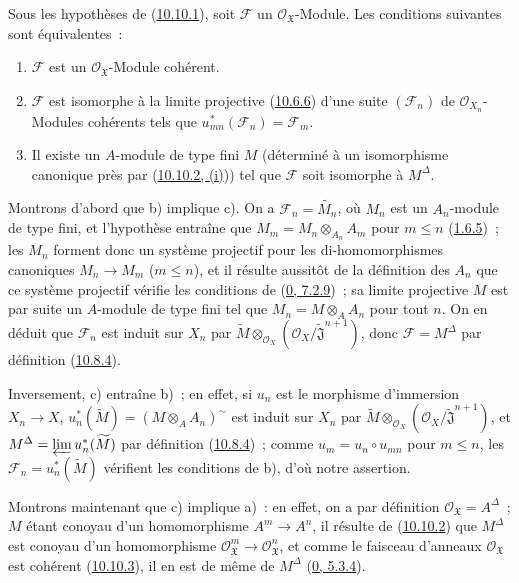 \begin{proposition}[10.10.5]
\label{I.10.10.5-fr}
Sous les hypothèses de (\hyperref[I.10.10.1-fr]{10.10.1}), soit
$\mathscr{F}$ un $\mathscr{O}_{\mathfrak{X}}$-Module. Les conditions
suivantes sont équivalentes~:
\begin{enumerate}
  \item[a)] $\mathscr{F}$ est un $\mathscr{O}_{\mathfrak{X}}$-Module
    cohérent.
  \item[b)] $\mathscr{F}$ est isomorphe à la limite projective
    (\hyperref[I.10.6.6-fr]{10.6.6}) d'une suite $(\mathscr{F}_n)$ de
    $\mathscr{O}_{X_n}$-Modules cohérents tels que
    $u_{mn}^*(\mathscr{F}_n)=\mathscr{F}_m$.
  \item[c)] Il existe un $A$-module de type fini $M$ (déterminé à un
    isomorphisme canonique près par
    (\hyperref[I.10.10.2-fr]{10.10.2, (i)})) tel que $\mathscr{F}$ soit
    isomorphe à $M^\Delta$.
\end{enumerate}
\end{proposition}

Montrons d'abord que b) implique c). On a
$\mathscr{F}_n=\widetilde{M_n}$, où $M_n$ est un $A_n$-module de type
fini, et l'hypothèse entraîne que
$M_m=M_n\otimes_{A_n}A_m$ pour $m\leq n$
(\hyperref[I.1.6.5-fr]{1.6.5})~; les $M_n$ forment donc un système
projectif pour les di-homomorphismes canoniques $M_n\to M_m$
($m\leq n$), et il résulte aussitôt de la définition des $A_n$ que ce
système projectif vérifie les conditions de
(\hyperref[0.7.2.9-fr]{0, 7.2.9})~; sa limite projective $M$ est par
suite un $A$-module de type fini tel que
$M_n=M\otimes_A A_n$ pour tout $n$. On en déduit que $\mathscr{F}_n$
est induit sur $X_n$ par
$\widetilde M\otimes_{\mathscr{O}_X}
(\mathscr{O}_X/\widetilde{\mathfrak{J}}^{n+1})$, donc
$\mathscr{F}=M^\Delta$ par définition
(\hyperref[I.10.8.4-fr]{10.8.4}).

Inversement, c) entraîne b)~; en effet, si $u_n$ est le morphisme
d'immersion $X_n\to X$,
$u_n^*(\widetilde M)=(M\otimes_A A_n)^{\sim}$ est induit sur $X_n$ par
$\widetilde M\otimes_{\mathscr{O}_X}
(\mathscr{O}_X/\widetilde{\mathfrak{J}}^{n+1})$, et
$M^\Delta=\varprojlim u_n^*(\widetilde M)$ par définition
(\hyperref[I.10.8.4-fr]{10.8.4})~; comme
$u_m=u_n\circ u_{mn}$ pour $m\leq n$, les
$\mathscr{F}_n=u_n^*(\widetilde M)$ vérifient les conditions de b),
d'où notre assertion.

Montrons maintenant que c) implique a)~: en effet, on a par définition
$\mathscr{O}_{\mathfrak{X}}=A^\Delta$~; $M$ étant conoyau d'un
homomorphisme $A^m\to A^n$, il résulte de
(\hyperref[I.10.10.2-fr]{10.10.2}) que $M^\Delta$ est conoyau d'un
homomorphisme
$\mathscr{O}_{\mathfrak{X}}^m\to\mathscr{O}_{\mathfrak{X}}^n$, et
comme le faisceau d'anneaux $\mathscr{O}_{\mathfrak{X}}$ est cohérent
(\hyperref[I.10.10.3-fr]{10.10.3}), il en est de même de $M^\Delta$
(\hyperref[0.5.3.4-fr]{0, 5.3.4}).

